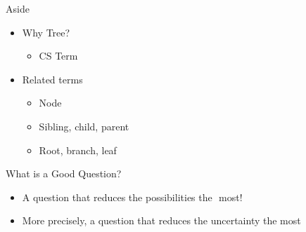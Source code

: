 \documentclass[aspectratio=169, 14pt]{beamer}
\begin{document}
\begin{frame}{Aside }
	\begin{itemize}
		\item Why Tree?
			\begin{itemize}
				\item CS Term
			\end{itemize}
		\item Related terms
			\begin{itemize}
				\item Node
				\item Sibling, child, parent
				\item Root, branch, leaf
			\end{itemize}
	\end{itemize}
\end{frame}


\begin{frame}{What is a Good Question?}
	\begin{overlayarea}{15cm}{3cm}
	\begin{itemize}
\item<2-> A question that reduces the possibilities the\, most!
\item<3-> More precisely, a question that reduces the uncertainty the most
	\end{itemize}
	
		\centering {}
	\end{overlayarea}
\end{frame}
\end{document}
